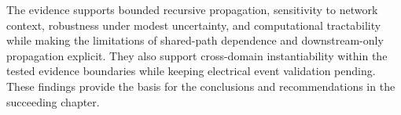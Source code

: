 The evidence supports bounded recursive propagation, sensitivity to
network context, robustness under modest uncertainty, and computational
tractability while making the limitations of shared-path dependence and
downstream-only propagation explicit. They also support cross-domain
instantiability within the tested evidence boundaries while keeping
electrical event validation pending. These findings provide the basis
for the conclusions and recommendations in the succeeding chapter.
